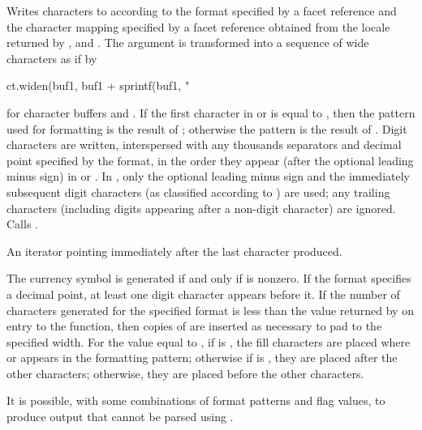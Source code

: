 \begin{itemdescr}
\pnum
\effects
Writes characters to  according to
the format specified by
a  facet reference  and
the character mapping specified by
a  facet reference 
obtained from the locale returned by ,
and .
The argument  is transformed into
a sequence of wide characters as if by
\begin{codeblock}
ct.widen(buf1, buf1 + sprintf(buf1, "%
\end{codeblock}
for character buffers  and .
If the first character in  or 
is equal to ,
then the pattern used for formatting is the result of ;
otherwise the pattern is the result of .
Digit characters are written,
interspersed with any thousands separators and decimal point
specified by the format,
in the order they appear (after the optional leading minus sign) in
 or .
In ,
only the optional leading minus sign and
the immediately subsequent digit characters
(as classified according to )
are used;
any trailing characters
(including digits appearing after a non-digit character)
are ignored.
Calls .

\pnum
\returns
An iterator pointing immediately after the last character produced.

\pnum
\remarks
The currency symbol is generated
if and only if  is nonzero.
If the format specifies a decimal point,
at least one digit character appears before it.
If the number of characters generated for the specified format
is less than the value returned by  on entry to the function,
then copies of  are inserted as necessary
to pad to the specified width.
For the value  equal to ,
if  is ,
the fill characters are placed
where  or  appears in the formatting pattern;
otherwise if  is ,
they are placed after the other characters;
otherwise, they are placed before the other characters.
\begin{note}
It is possible, with some combinations of format patterns and flag values,
to produce output that cannot be parsed using .
\end{note}
\end{itemdescr}

